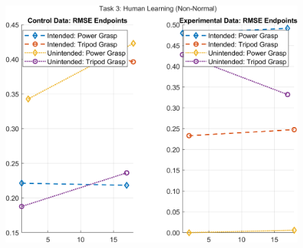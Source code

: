 \documentclass[12pt]{article}
\newcommand\figWidth{7in}
\begin{document}
\begin{figure}
    \includegraphics[width = \figWidth]{t3-spaghetti-xnorm.png}
\end{figure}
\end{document}
